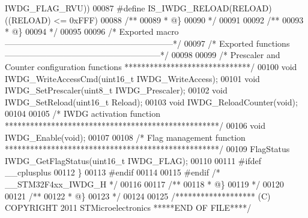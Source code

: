 \begin{DoxyCode}
      IWDG_FLAG_RVU\textcolor{preprocessor}{)}\textcolor{preprocessor}{)}
00087 \textcolor{preprocessor}{#}\textcolor{preprocessor}{define} \textcolor{preprocessor}{IS\_IWDG\_RELOAD}\textcolor{preprocessor}{(}\textcolor{preprocessor}{RELOAD}\textcolor{preprocessor}{)} \textcolor{preprocessor}{(}\textcolor{preprocessor}{(}\textcolor{preprocessor}{RELOAD}\textcolor{preprocessor}{)} \textcolor{preprocessor}{<=} 0xFFF\textcolor{preprocessor}{)}
00088 \textcolor{comment}{/**}
00089 \textcolor{comment}{  * @\}}
00090 \textcolor{comment}{  */}
00091 
00092 \textcolor{comment}{/**}
00093 \textcolor{comment}{  * @\}}
00094 \textcolor{comment}{  */}
00095 
00096 \textcolor{comment}{/* Exported macro ------------------------------------------------------------*/}
00097 \textcolor{comment}{/* Exported functions --------------------------------------------------------*/}
00098 
00099 \textcolor{comment}{/* Prescaler and Counter configuration functions ******************************/}
00100 \textcolor{keywordtype}{void} IWDG_WriteAccessCmd(uint16\_t IWDG\_WriteAccess);
00101 \textcolor{keywordtype}{void} IWDG_SetPrescaler(uint8\_t IWDG\_Prescaler);
00102 \textcolor{keywordtype}{void} IWDG_SetReload(uint16\_t Reload);
00103 \textcolor{keywordtype}{void} IWDG_ReloadCounter(\textcolor{keywordtype}{void});
00104 
00105 \textcolor{comment}{/* IWDG activation function ***************************************************/}
00106 \textcolor{keywordtype}{void} IWDG_Enable(\textcolor{keywordtype}{void});
00107 
00108 \textcolor{comment}{/* Flag management function ***************************************************/}
00109 FlagStatus IWDG_GetFlagStatus(uint16\_t IWDG\_FLAG);
00110 
00111 \textcolor{preprocessor}{#}\textcolor{preprocessor}{ifdef} \_\_cplusplus
00112 \}
00113 \textcolor{preprocessor}{#}\textcolor{preprocessor}{endif}
00114 
00115 \textcolor{preprocessor}{#}\textcolor{preprocessor}{endif} \textcolor{comment}{/* \_\_STM32F4xx\_IWDG\_H */}
00116 
00117 \textcolor{comment}{/**}
00118 \textcolor{comment}{  * @\}}
00119 \textcolor{comment}{  */}
00120 
00121 \textcolor{comment}{/**}
00122 \textcolor{comment}{  * @\}}
00123 \textcolor{comment}{  */}
00124 
00125 \textcolor{comment}{/******************* (C) COPYRIGHT 2011 STMicroelectronics *****END OF FILE****/}
\end{DoxyCode}
